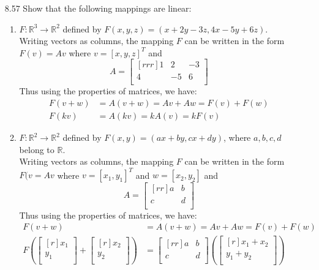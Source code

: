 \documentclass[12pt]{article}
\theoremstyle{definition}
\theoremstyle{plain}
\begin{document}
\begin{enumerate}
\item[8.57] Show that the following mappings are linear:
	\begin{enumerate}
	\item $F: \mathbb{R}^3\rightarrow\mathbb{R}^2$ defined by $F(x,y,z)=(x+2y-3z,4x-5y+6z)$.\\
	Writing vectors as columns, the mapping $F$ can be written in the form $F(v) = Av$ where $v=[x,y,z]^T$ and
	\[ A= \begin{bmatrix}[rrr]1&2&-3\\4&-5&6\\\end{bmatrix} \]
	Thus using the properties of matrices, we have:
	\begin{align*}
	F(v+w) &= A(v+w) = Av + Aw = F(v)+F(w)\\
	F(kv) &= A(kv) = kA(v) = kF(v)
	\end{align*}
	\item $F:\mathbb{R}^2\rightarrow\mathbb{R}^2$ defined by $F(x,y)=(ax+by,cx+dy)$, where $a,b,c,d$ belong to $\mathbb{R}$.\\
	Writing vectors as columns, the mapping $F$ can be written in the form $F(v=Av$ where $v=[x_1,y_1]^T$ and $w=[x_2,y_2]$ and
	\[ A=\begin{bmatrix}[rr]a&b\\c&d\\\end{bmatrix} \]
	Thus using the properties of matrices, we have:
	\begin{align*}
	F(v+w) &= A(v+w) = Av + Aw = F(v) + F(w)\\
	F(\begin{bmatrix}[r]x_1\\y_1\\\end{bmatrix} + \begin{bmatrix}[r]x_2\\y_2\\\end{bmatrix}) &= \begin{bmatrix}[rr]a&b\\c&d\\\end{bmatrix}(\begin{bmatrix}[r]x_1+x_2\\y_1+y_2\\\end{bmatrix})\\

\end{align*}
\end{enumerate}
\end{enumerate}
\end{document}
